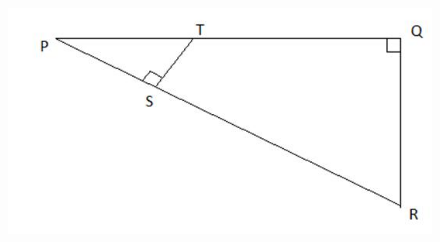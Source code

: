 \begin{enumerate}
\begin{figure}[!ht]
		\centering
		\includegraphics[width=\columnwidth]{figs/icse1.jpg}
		\caption{}
		\label{fig:enter-label}
\end{figure}
\end{enumerate}
	
